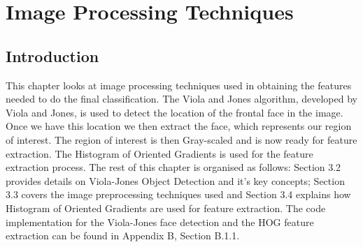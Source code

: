 \chapter{Image Processing Techniques} %
%


\section{Introduction} %
This chapter looks at image processing techniques used in obtaining the features needed to do the final classification. The Viola and Jones algorithm, developed by Viola and Jones, is used to detect the location of the frontal face in the image. Once we have this location we then extract the face, which represents our region of interest. The region of interest is then Gray-scaled and is now ready for feature extraction. The Histogram of Oriented Gradients is used for the feature extraction process. 
\newline
The rest of this chapter is organised as follows: Section 3.2 provides details on Viola-Jones Object Detection and it's key concepts; Section 3.3 covers the image preprocessing techniques used and Section 3.4 explains how Histogram of Oriented Gradients are used for feature extraction. The code implementation for the Viola-Jones face detection and the HOG feature extraction can be found in Appendix B, Section B.1.1.

